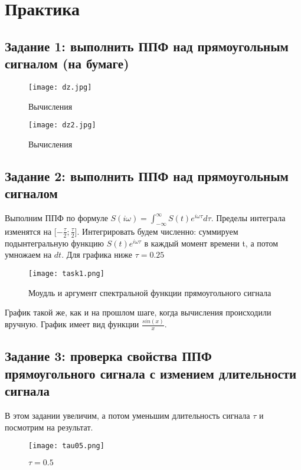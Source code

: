 \chapter{Практика}
\label{ch:chap2}

\section*{\textbf{Задание 1: выполнить ППФ над прямоугольным сигналом (на бумаге)}}

\begin{figure}[H]
    \centering
    \texttt{[image: dz.jpg]}
    \caption{Вычисления}
\end{figure}

\begin{figure}[H]
    \centering
    \texttt{[image: dz2.jpg]}
    \caption{Вычисления}
\end{figure}

\section*{\textbf{Задание 2: выполнить ППФ над прямоугольным сигналом}}

Выполним ППФ по формуле $S(i\omega) = \int_{-\infty}^{\infty}S(t)e^{i\omega \tau} d\tau$. Пределы интеграла изменятся на 
[$-\frac{\tau}{2};\frac{\tau}{2}$]. Интегрировать будем численно: суммируем подынтегральную функцию 
$S(t)e^{i\omega \tau}$ в каждый момент времени t, а потом умножаем на $dt$. Для графика ниже $\tau = 0.25$

\begin{figure}[H]
    \centering
    \texttt{[image: task1.png]}
    \caption{Моудль и аргумент спектральной функции прямоугольного сигнала}
\end{figure}

График такой же, как и на прошлом шаге, когда вычисления происходили вручную. График имеет вид функции $\frac{sin(x)}{x}$.

\section*{\textbf{Задание 3: проверка свойства ППФ прямоугольного сигнала с измением длительности сигнала}}

В этом задании увеличим, а потом уменьшим длительность сигнала $\tau$ и посмотрим на результат.

\begin{figure}[H]
    \centering
    \texttt{[image: tau05.png]}
    \caption{$\tau = 0.5$}
\end{figure}

